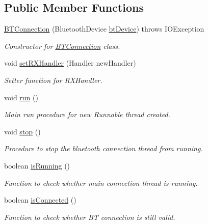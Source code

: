 \subsection*{Public Member Functions}
\begin{DoxyCompactItemize}
\item 
\hyperlink{class_android_app_1_1_b_t_connection_a9211856a493caa2423f07e36c2fd12b6}{B\+T\+Connection} (Bluetooth\+Device \hyperlink{class_android_app_1_1_b_t_connection_a3ed1e51b0f24f0b20ca5c27270f2999c}{bt\+Device})  throws I\+O\+Exception 
\begin{DoxyCompactList}\small\item\em Constructor for \hyperlink{class_android_app_1_1_b_t_connection}{B\+T\+Connection} class. \end{DoxyCompactList}\item 
void \hyperlink{class_android_app_1_1_b_t_connection_a41022747db3c5a8bf0f4ddbc7bf32a3d}{set\+R\+X\+Handler} (Handler new\+Handler)
\begin{DoxyCompactList}\small\item\em Setter function for R\+X\+Handler. \end{DoxyCompactList}\item 
void \hyperlink{class_android_app_1_1_b_t_connection_a03907fd685748cb0da88a7f17d90885f}{run} ()
\begin{DoxyCompactList}\small\item\em Main run procedure for new Runnable thread created. \end{DoxyCompactList}\item 
\mbox{\label{class_android_app_1_1_b_t_connection_a4f542434c59f541d47b68a0e225cfea9}} 
void \hyperlink{class_android_app_1_1_b_t_connection_a4f542434c59f541d47b68a0e225cfea9}{stop} ()
\begin{DoxyCompactList}\small\item\em Procedure to stop the bluetooth connection thread from running. \end{DoxyCompactList}\item 
boolean \hyperlink{class_android_app_1_1_b_t_connection_a88abb39350aef278f15e54be4d0d1df3}{is\+Running} ()
\begin{DoxyCompactList}\small\item\em Function to check whether main connection thread is running. \end{DoxyCompactList}\item 
boolean \hyperlink{class_android_app_1_1_b_t_connection_a1c91fcddfe9f3b69cd0141742103191a}{is\+Connected} ()
\begin{DoxyCompactList}\small\item\em Function to check whether BT connection is still valid. \end{DoxyCompactList}\end{DoxyCompactItemize}
